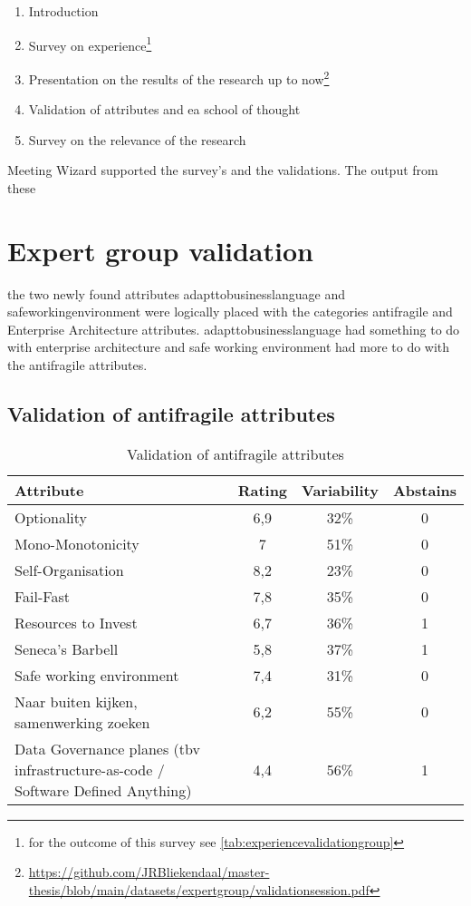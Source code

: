 \begin{enumerate}
	\item{Introduction}
	\item{Survey on experience\footnote{for the outcome of this survey see \cref{tab:experiencevalidationgroup}}}
	\item{Presentation on the results of the research up to now\footnote{\url{https://github.com/JRBliekendaal/master-thesis/blob/main/datasets/expertgroup/validationsession.pdf}}}
	\item{Validation of attributes and ea school of thought}
	\item{Survey on the relevance of the research}
\end{enumerate}
Meeting Wizard supported the survey's and the validations. The output from these 




\section{Expert group validation}
\label{sec:expertgroupvalidation}

the two newly found attributes \gls{adapttobusinesslanguage} and \gls{safeworkingenvironment} were logically placed with the categories antifragile and Enterprise Architecture attributes. \Gls{adapttobusinesslanguage} had something to do with enterprise architecture and safe working environment had more to do with the antifragile attributes.


\subsection{Validation of antifragile attributes}
\label{sub:validationofantifragileattributes}

\begin{table}[H]
	\centering
	\begin{tabular}{p{}ccc}
		\toprule
		\textbf{Attribute} & \textbf{Rating} & \textbf{Variability} & \textbf{Abstains} \\
		\midrule
		Optionality & 6,9 & 32\% & 0 \\%
		Mono-Monotonicity & 7 & 51\% & 0 \\%
		Self-Organisation & 8,2 & 23\% & 0 \\%
		Fail-Fast & 7,8 & 35\% & 0 \\%
		Resources to Invest & 6,7 & 36\% & 1 \\%
		Seneca's Barbell & 5,8 & 37\% & 1 \\%
		Safe working environment & 7,4 & 31\% & 0 \\%
		Naar buiten kijken, samenwerking zoeken & 6,2 & 55\% & 0 \\%
		Data Governance planes (tbv infrastructure-as-code / Software Defined Anything) & 4,4 & 56\% & 1 \\%
		\bottomrule
	\end{tabular}%
	\caption{Validation of antifragile attributes}
	\label{tab:validationofantifragileattributes}%
\end{table}%


